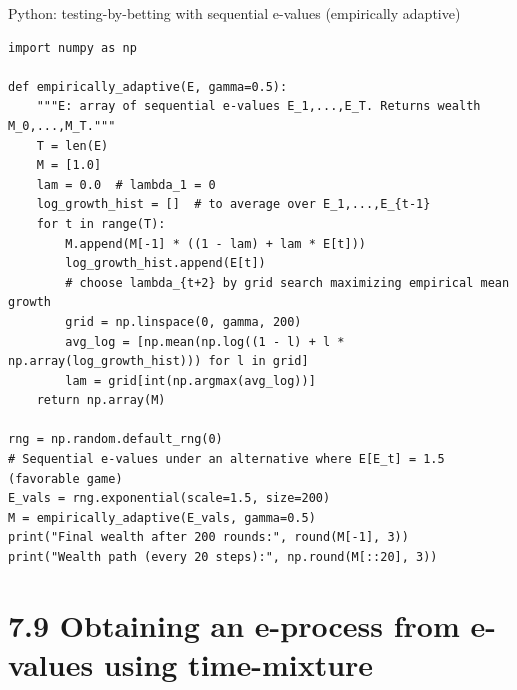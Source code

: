 \documentclass[aspectratio=169,10pt]{beamer}
\begin{document}
\begin{frame}[fragile]{Python: testing-by-betting with sequential e-values (empirically adaptive)}

\begin{lstlisting}
import numpy as np

def empirically_adaptive(E, gamma=0.5):
    """E: array of sequential e-values E_1,...,E_T. Returns wealth M_0,...,M_T."""
    T = len(E)
    M = [1.0]
    lam = 0.0  # lambda_1 = 0
    log_growth_hist = []  # to average over E_1,...,E_{t-1}
    for t in range(T):
        M.append(M[-1] * ((1 - lam) + lam * E[t]))
        log_growth_hist.append(E[t])
        # choose lambda_{t+2} by grid search maximizing empirical mean growth
        grid = np.linspace(0, gamma, 200)
        avg_log = [np.mean(np.log((1 - l) + l * np.array(log_growth_hist))) for l in grid]
        lam = grid[int(np.argmax(avg_log))]
    return np.array(M)

rng = np.random.default_rng(0)
# Sequential e-values under an alternative where E[E_t] = 1.5 (favorable game)
E_vals = rng.exponential(scale=1.5, size=200)
M = empirically_adaptive(E_vals, gamma=0.5)
print("Final wealth after 200 rounds:", round(M[-1], 3))
print("Wealth path (every 20 steps):", np.round(M[::20], 3))
\end{lstlisting}

\end{frame}

\section{7.9 Obtaining an e-process from e-values using time-mixture}
\end{document}
